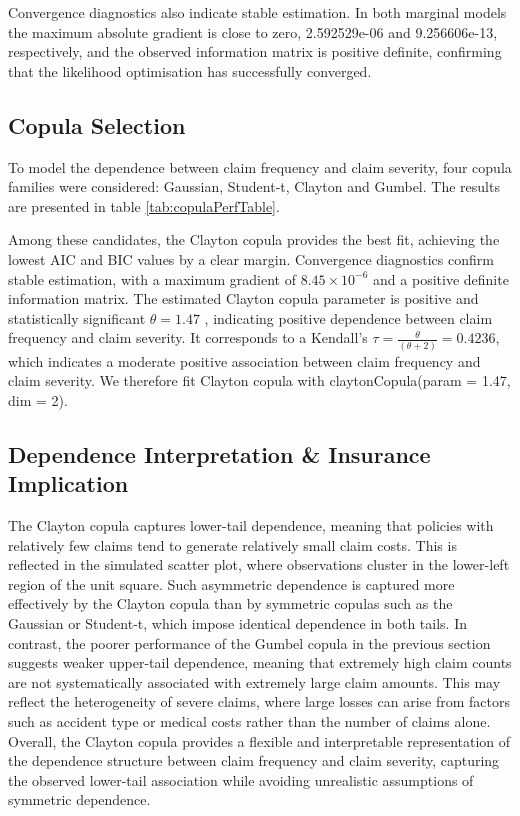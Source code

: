 \documentclass[
]{article}
\theoremstyle{plain}
\theoremstyle{definition}
\theoremstyle{remark}
\begin{document}
Convergence diagnostics also indicate stable estimation. In both marginal models the maximum absolute gradient is close to zero, 2.592529e-06 and 9.256606e-13, respectively, and the observed information matrix is positive definite, confirming that the likelihood optimisation has successfully converged.

\subsection{Copula Selection}\label{copula-selection}

To model the dependence between claim frequency and claim severity, four copula families were considered: Gaussian, Student-t, Clayton and Gumbel.
The results are presented in table \ref{tab:copulaPerfTable}.

Among these candidates, the Clayton copula provides the best fit, achieving the lowest AIC and BIC values by a clear margin. Convergence diagnostics confirm stable estimation, with a maximum gradient of \(8.45 \times 10^{-6}\) and a positive definite information matrix.
The estimated Clayton copula parameter is positive and statistically significant \(\theta = 1.47\) , indicating positive dependence between claim frequency and claim severity. It corresponds to a Kendall's \(\tau = \frac{\theta}{(\theta+2)} = 0.4236\), which indicates a moderate positive association between claim frequency and claim severity.
We therefore fit Clayton copula with claytonCopula(param = 1.47, dim = 2).

\subsection{Dependence Interpretation \& Insurance Implication}\label{dependence-interpretation-insurance-implication}

The Clayton copula captures lower-tail dependence, meaning that policies with relatively few claims tend to generate relatively small claim costs. This is reflected in the simulated scatter plot, where observations cluster in the lower-left region of the unit square. Such asymmetric dependence is captured more effectively by the Clayton copula than by symmetric copulas such as the Gaussian or Student-t, which impose identical dependence in both tails.
In contrast, the poorer performance of the Gumbel copula in the previous section suggests weaker upper-tail dependence, meaning that extremely high claim counts are not systematically associated with extremely large claim amounts. This may reflect the heterogeneity of severe claims, where large losses can arise from factors such as accident type or medical costs rather than the number of claims alone.
Overall, the Clayton copula provides a flexible and interpretable representation of the dependence structure between claim frequency and claim severity, capturing the observed lower-tail association while avoiding unrealistic assumptions of symmetric dependence.
\end{document}
